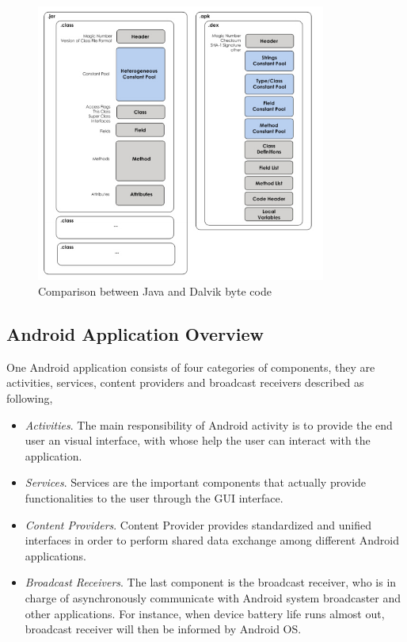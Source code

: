  \begin{figure}[!htb]
	\centering
	\includegraphics[width=0.85\textwidth]{clas-vs-dex.jpg}
		\caption{Comparison between Java and Dalvik byte code \cite{android_vm}}
	\label{fig:class-vs-dex}
\end{figure}

\subsection{Android Application Overview} \label{secAppComponents}
One Android application consists	 of four categories of components, they are activities, services, content providers and broadcast receivers \cite{android_secure_design} described as following,
\begin{itemize}
\item  \emph{Activities}. The main responsibility of Android activity is to provide the end user an visual interface, with whose help the user can interact with the application.  
\item  \emph{Services}. Services are the important components that actually provide functionalities to the user through the  GUI interface.
\item  \emph{Content Providers}. Content Provider provides standardized and unified interfaces in order to perform shared data exchange among different Android applications.
\item  \emph{Broadcast Receivers}. The last component is the broadcast receiver, who is in charge of  asynchronously communicate with Android system broadcaster and other applications. For instance, when device battery life runs almost out, broadcast receiver will then be informed by Android OS.
\end{itemize}

